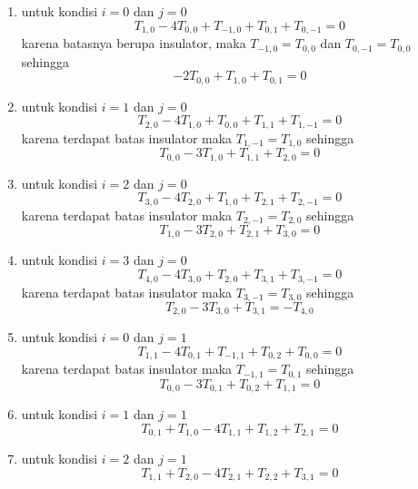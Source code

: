 \documentclass[a4paper,12pt]{article}
\numberwithin{equation}{section} %
\begin{document}
\begin{enumerate}
\item untuk kondisi $i = 0$ dan $j = 0$
$$T_{1,0} - 4T_{0,0} + T_{-1,0} + T_{0,1} + T_{0,-1} = 0$$
karena batasnya berupa insulator, maka $T_{-1,0} = T_{0,0}$ dan $T_{0,-1} = T_{0,0}$ sehingga
\begin{equation}
-2T_{0,0} + T_{1,0} + T_{0,1} = 0
\end{equation}

\item untuk kondisi $i = 1$ dan $j = 0$
$$T_{2,0} - 4T_{1,0} + T_{0,0} + T_{1,1} + T_{1,-1} = 0$$
karena terdapat batas insulator maka $T_{1,-1} = T_{1,0}$ sehingga
\begin{equation}
T_{0,0} - 3T_{1,0} + T_{1,1} + T_{2,0} = 0
\end{equation}

\item untuk kondisi $i = 2$ dan $j = 0$
$$T_{3,0} - 4T_{2,0} + T_{1,0} + T_{2,1} + T_{2,-1} = 0$$
karena terdapat batas insulator maka $T_{2,-1} = T_{2,0}$ sehingga
\begin{equation}
T_{1,0} - 3T_{2,0} + T_{2,1} + T_{3,0} = 0
\end{equation}

\item untuk kondisi $i = 3$ dan $j = 0$
$$T_{4,0} - 4T_{3,0} + T_{2,0} + T_{3,1} + T_{3,-1} = 0$$
karena terdapat batas insulator maka $T_{3,-1} = T_{3,0}$ sehingga
\begin{equation}
T_{2,0} - 3T_{3,0} + T_{3,1} = -T_{4,0}
\end{equation}

\item untuk kondisi $i = 0$ dan $j = 1$
$$T_{1,1} - 4T_{0,1} + T_{-1,1} + T_{0,2} + T_{0,0} = 0$$
karena terdapat batas insulator maka $T_{-1,1} = T_{0,1}$ sehingga
\begin{equation}
T_{0,0} - 3T_{0,1} + T_{0,2} + T_{1,1} = 0
\end{equation}

\item untuk kondisi $i = 1$ dan $j = 1$
\begin{equation}
T_{0,1} + T_{1,0} - 4T_{1,1} + T_{1,2} + T_{2,1} =0
\end{equation}

\item untuk kondisi $i = 2$ dan $j = 1$
\begin{equation}
T_{1,1} + T_{2,0} - 4T_{2,1} + T_{2,2} + T_{3,1} =0
\end{equation}


\end{enumerate}
\end{document}
